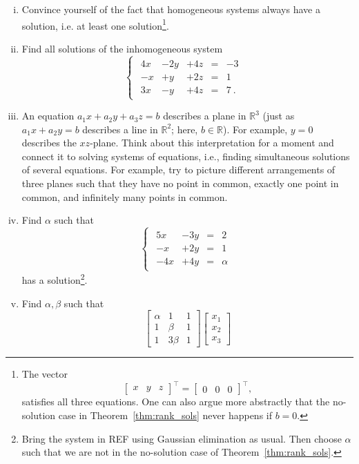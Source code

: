 \begin{exercise}
\begin{enumerate}[(i)]
	\item Convince yourself of the fact that homogeneous systems always have a solution, i.e. at least one solution\footnote{The vector 
	\[ \begin{bmatrix} x & y & z \end{bmatrix}^\top
	=  \begin{bmatrix} 0 & 0 & 0 \end{bmatrix}^\top, \]
	satisfies all three equations. One can also argue more abstractly that the no-solution case in Theorem~\ref{thm:rank_sols} never happens if $b=0$.}.
	\item Find all solutions of the inhomogeneous system
	\[ \begin{cases}	
	\begin{array}{rrrrrrr}
	4x & -2y & +4z & = & -3 \phantom{\:.}\\
	-x &  +y & +2z & = & 1 \phantom{\:.}\\
	3x &  -y & +4z & = & 7 \:.
	\end{array} \end{cases} \]
	\item An equation $a_1 x + a_2 y + a_3 z = b$ describes a plane in $\mathbb{R}^3$ (just as $a_1x+a_2y=b$ describes a line in $\mathbb{R}^2$; here, $b\in\mathbb{R}$). For example, $y = 0$ describes the $xz$-plane. Think about this interpretation for a moment and connect it to solving systems of equations, i.e., finding simultaneous solutions of several equations. For example, try to picture different arrangements of three planes such that they have no point in common, exactly one point in common, and infinitely many points in common.
	\item Find $\alpha$ such that
	\[ \begin{cases}
	\begin{array}{rrrrrrr}
	5x & -3y & = & 2 \\
	-x & +2y & = & 1 \\
	-4x & +4y & = & \alpha 
	\end{array} \end{cases} \]
	has a solution\footnote{Bring the system in REF using Gaussian elimination as usual. Then choose $\alpha$ such that we are not in the no-solution case of Theorem~\ref{thm:rank_sols}.}.
	\item Find $\alpha, \beta$ such that
	\[ \begin{bmatrix}
	\alpha & 1 & 1 \\ 1 & \beta & 1 \\ 1 & 3\beta & 1
	\end{bmatrix} \begin{bmatrix} x_1 \\ x_2 \\ x_3

\end{bmatrix}\]
\end{enumerate}
\end{exercise}
